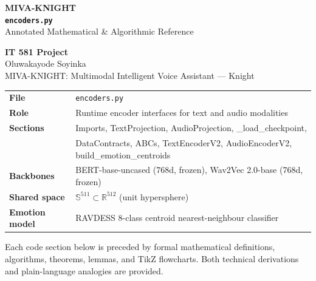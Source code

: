 \documentclass[12pt,a4paper]{article}
\theoremstyle{definition}
\theoremstyle{remark}
\begin{document}
\begin{titlepage}
\centering\vspace*{1.5cm}
{\Huge\bfseries\color{cDark} MIVA-KNIGHT}\\[0.4cm]
{\Large\bfseries \texttt{encoders.py}}\\[0.3cm]
{\large Annotated Mathematical \& Algorithmic Reference}\\[1.0cm]


\vspace{1cm}
{\large\bfseries IT 581 Project}\\[0.3cm]
{\large Oluwakayode Soyinka}\\[0.3cm]
{\normalsize MIVA-KNIGHT: Multimodal Intelligent Voice Assistant — Knight}\\[0.8cm]

\begin{tabular}{ll}
\toprule
\textbf{File}           & \texttt{encoders.py} \\
\textbf{Role}           & Runtime encoder interfaces for text and audio modalities \\
\textbf{Sections}       & Imports, TextProjection, AudioProjection, \_load\_checkpoint, \\
                        & DataContracts, ABCs, TextEncoderV2, AudioEncoderV2,
                          build\_emotion\_centroids \\
\textbf{Backbones}      & BERT-base-uncased (768d, frozen), Wav2Vec 2.0-base (768d, frozen) \\
\textbf{Shared space}   & $\mathbb{S}^{511} \subset \mathbb{R}^{512}$ (unit hypersphere) \\
\textbf{Emotion model}  & RAVDESS 8-class centroid nearest-neighbour classifier \\
\bottomrule
\end{tabular}

\vfill
{\small\color{gray}Each code section below is preceded by formal mathematical
definitions, algorithms, theorems, lemmas, and TikZ flowcharts.
Both technical derivations and plain-language analogies are provided.}
\end{titlepage}
\end{document}
